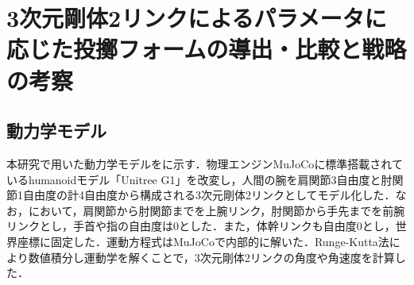 \section{3次元剛体2リンクによるパラメータに応じた投擲フォームの導出・比較と戦略の考察}
\subsection{動力学モデル}
本研究で用いた動力学モデルをに示す．物理エンジンMuJoCo\cite{mujoco}に標準搭載されているhumanoidモデル「Unitree G1」\cite{unitreeg1}を改変し，人間の腕を肩関節3自由度と肘関節1自由度の計4自由度から構成される3次元剛体2リンクとしてモデル化した．なお，において，肩関節から肘関節までを上腕リンク，肘関節から手先までを前腕リンクとし，手首や指の自由度は0とした．また，体幹リンクも自由度0とし，世界座標に固定した．運動方程式はMuJoCoで内部的に解いた．Runge-Kutta法により数値積分し運動学を解くことで，3次元剛体2リンクの角度や角速度を計算した．
